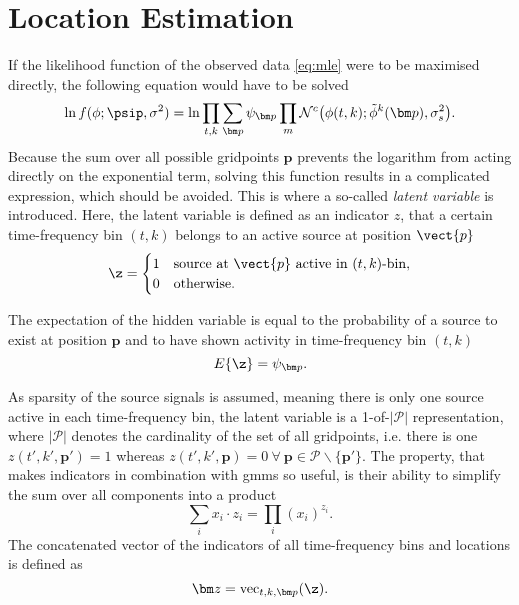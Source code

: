 \section{Location Estimation}
\label{sec:algLocEst}

If the likelihood function of the observed data \eqref{eq:mle} were to be maximised directly, the following equation would have to be solved
\begin{equation}
    \ln f(\phi;\psip,\sigma^2) = \ln\prod_{t,k}\sum_{\bm p}\psi_{\bm p}\prod_m\mathcal{N}^c\big(\phi(t,k);\tilde\phi^k(\bm p),\sigma^2_{s}\big).
\end{equation}
Because the sum over all possible gridpoints $\bm p$ prevents the logarithm from acting directly on the exponential term, solving this function results in a complicated expression, which should be avoided. This is where a so-called \textit{latent variable} is introduced. Here, the latent variable is defined as an indicator $z$, that a certain time-frequency bin $(t,k)$ belongs to an active source at position $\vect{p}$ 
\begin{equation}
	\z=\begin{cases}
	    1& \text{source at $\vect{p}$ active in $(t,k)$-bin},\\
       0& \text{otherwise}.
	\end{cases}
\end{equation}

The expectation of the hidden variable is equal to the probability of a source to exist at position $\bm p$ and to have shown activity in time-frequency bin $(t, k)$ 
\begin{equation}
    E\{\z\}=\psi_{\bm p}.
\end{equation}

As sparsity of the source signals is assumed, meaning there is only one source active in each time-frequency bin, the latent variable is a 1-of-$|\mathcal{P}|$ representation, where $|\mathcal{P}|$ denotes the cardinality of the set of all gridpoints, i.e. there is one $z(t',k',\bm p')=1$ whereas $z(t',k',\bm p)=0\ \forall\ \bm p\in\mathcal{P}\smallsetminus\{\bm p'\}$. The property, that makes indicators in combination with \glspl{gmm} so useful, is their ability to simplify the sum over all components into a product
\begin{equation}
\label{eq:indicator-sum-product}
    \sum_{i}x_i\cdot z_i=\prod_i (x_i)^{z_i}.
\end{equation}
The concatenated vector of the indicators of all time-frequency bins and locations is defined as
\begin{equation}
    \bm z=\text{vec}_{t,k,\bm p}(\z).
\end{equation}

